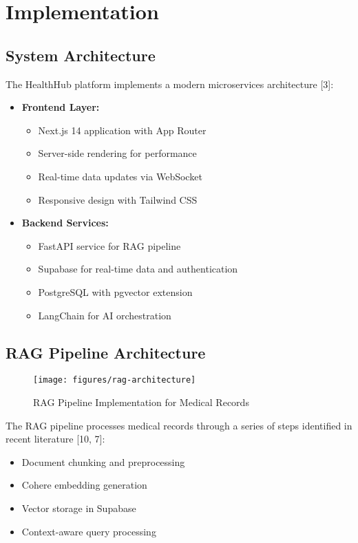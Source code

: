 \section{Implementation}

\subsection{System Architecture}
The HealthHub platform implements a modern microservices architecture [3]:

\begin{itemize}
\item \textbf{Frontend Layer:}
    \begin{itemize}
    \item Next.js 14 application with App Router
    \item Server-side rendering for performance
    \item Real-time data updates via WebSocket
    \item Responsive design with Tailwind CSS
    \end{itemize}

\item \textbf{Backend Services:}
    \begin{itemize}
    \item FastAPI service for RAG pipeline
    \item Supabase for real-time data and authentication
    \item PostgreSQL with pgvector extension
    \item LangChain for AI orchestration
    \end{itemize}
\end{itemize}

\subsection{RAG Pipeline Architecture}
\begin{figure}[!t]
\centering
\texttt{[image: figures/rag-architecture]}
\caption{RAG Pipeline Implementation for Medical Records}
\label{fig:rag-architecture}
\end{figure}

The RAG pipeline processes medical records through a series of steps identified in recent literature [10, 7]:
\begin{itemize}
\item Document chunking and preprocessing
\item Cohere embedding generation
\item Vector storage in Supabase
\item Context-aware query processing
\end{itemize}


